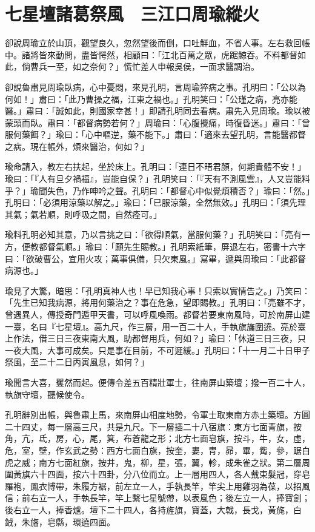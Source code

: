 
\chapter{七星壇諸葛祭風　三江口周瑜縱火}

卻說周瑜立於山頂，觀望良久，忽然望後而倒，口吐鮮血，不省人事。左右救回帳中。諸將皆來動問，盡皆愕然，相顧曰：「江北百萬之眾，虎踞鯨吞。不料都督如此，倘曹兵一至，如之奈何？」慌忙差人申報吳侯，一面求醫調治。

卻說魯肅見周瑜臥病，心中憂悶，來見孔明，言周瑜猝病之事。孔明曰：「公以為何如！」肅曰：「此乃曹操之福，江東之禍也。」孔明笑曰：「公瑾之病，亮亦能醫。」肅曰：「誠如此，則國家幸甚！」即請孔明同去看病。肅先入見周瑜。瑜以被蒙頭而臥。肅曰：「都督病勢若何？」周瑜曰：「心腹攪痛，時復昏迷。」肅曰：「曾服何藥餌？」瑜曰：「心中嘔逆，藥不能下。」肅曰：「適來去望孔明，言能醫都督之病。現在帳外，煩來醫治，何如？」

瑜命請入，教左右扶起，坐於床上。孔明曰：「連日不晤君顏，何期貴體不安！」瑜曰：「『人有旦夕禍福』，豈能自保？」孔明笑曰：「『天有不測風雲』，人又豈能料乎？」瑜聞失色，乃作呻吟之聲。孔明曰：「都督心中似覺煩積否？」瑜曰：「然。」孔明曰：「必須用涼藥以解之。」瑜曰：「已服涼藥，全然無效。」孔明曰：「須先理其氣；氣若順，則呼吸之間，自然痊可。」

瑜料孔明必知其意，乃以言挑之曰：「欲得順氣，當服何藥？」孔明笑曰：「亮有一方，便教都督氣順。」瑜曰：「願先生賜教。」孔明索紙筆，屏退左右，密書十六字曰：「欲破曹公，宜用火攻；萬事俱備，只欠東風。」寫畢，遞與周瑜曰：「此都督病源也。」

瑜見了大驚，暗思：「孔明真神人也！早已知我心事！只索以實情告之。」乃笑曰：「先生已知我病源，將用何藥治之？事在危急，望即賜教。」孔明曰：「亮雖不才，曾遇異人，傳授奇門遁甲天書，可以呼風喚雨。都督若要東南風時，可於南屏山建一臺，名曰『七星壇』。高九尺，作三層，用一百二十人，手執旗旛圍遶。亮於臺上作法，借三日三夜東南大風，助都督用兵，何如？」瑜曰：「休道三日三夜，只一夜大風，大事可成矣。只是事在目前，不可遲緩。」孔明曰：「十一月二十日甲子祭風，至二十二日丙寅風息，如何？」

瑜聞言大喜，矍然而起。便傳令差五百精壯軍士，往南屏山築壇；撥一百二十人，執旗守壇，聽候使令。

孔明辭別出帳，與魯肅上馬，來南屏山相度地勢，令軍士取東南方赤土築壇。方圓二十四丈，每一層高三尺，共是九尺。下一層插二十八宿旗：東方七面青旗，按角，亢，氐，房，心，尾，箕，布蒼龍之形；北方七面皂旗，按斗，牛，女，虛，危，室，壁，作玄武之勢：西方七面白旗，按奎，婁，冑，昴，畢，觜，參，踞白虎之威；南方七面紅旗，按井，鬼，柳，星，張，翼，軫，成朱雀之狀。第二層周圍黃旗六十四面，按六十四卦，分八位而立。上一層用四人，各人戴束髮冠，穿皂羅袍，鳳衣博帶，朱履方裾，前左立一人，手執長竿，竿尖上用雞羽為葆，以招風信；前右立一人，手執長竿，竿上繫七星號帶，以表風色；後左立一人，捧寶劍；後右立一人，捧香爐。壇下二十四人，各持旌旗，寶蓋，大戟，長戈，黃旄，白銊，朱旛，皂縣，環遶四面。

